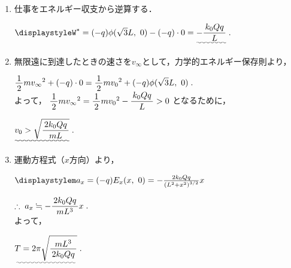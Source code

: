 ﻿\documentclass[../../../ps_a.tex]{subfiles}
\begin{document}
\begin{enumerate}
            \myspaceb%
            $\displaystyle%
                \uwave{v_0 > \sqrt{\myfracc{2k_0 Qq}{mL}}} \;.
            $
        \item%
            仕事をエネルギー収支から逆算する．
            
            \myspaceb%
            $\displaystyle%
                W^* = (-q) \phi (\sqrt{3}L,\myspacea 0) - (-q) \cdot 0%
                = \uwave{- \myfracc{k_0 Qq}{L}}\;.
            $
        \item%
            無限遠に到達したときの速さを$v_\infty$として，力学的エネルギー保存則より，
            
            \myspaceb%
            $\displaystyle%
                \myfraca{1}{2}m{v_\infty}^2 + (-q) \cdot 0
                = \myfraca{1}{2}m{v_0}^2 + (-q) \phi(\sqrt{3}L,\myspacea 0) \;. 
            $\\
            よって，%
            $\myfraca{1}{2}m{v_\infty}^2%
            =\myfraca{1}{2}m{v_0}^2 - \myfracc{k_0 Qq}{L} > 0$%
            となるために，
            
            \myspaceb%
            $\displaystyle%
                \uwave{v_0 > \sqrt{\myfracc{2k_0 Qq}{mL}}} \;.
            $
        \item%
            運動方程式（$x$方向）より，
            
            \myspaceb%
            $\displaystyle%
                m a_x = (-q) E_x(x,\myspacea 0)
                = -\frac{2k_0 Qq}{\left(L^2+x^2\right)^{3/2}} x
            $

            \myspaceb%
            $\displaystyle%
                \therefore \; a_x \fallingdotseq -\myfracc{2k_0 Qq}{mL^3} x \;.
            $\\
            よって，
            
            \myspaceb%
            $\displaystyle%
                \uwave{T = 2\pi \sqrt{\myfraca{mL^3}{2k_0 Qq}}} \;.
            $
    \end{enumerate}
\end{document}
